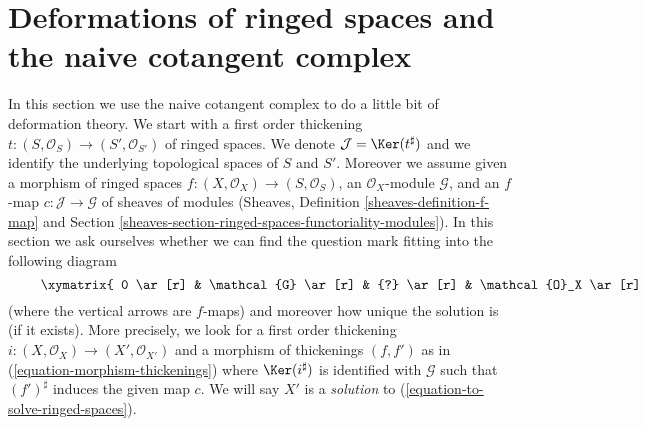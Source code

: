 \section{Deformations of ringed spaces and the naive cotangent complex}
\label{section-deformations-ringed-spaces}

\noindent
In this section we use the naive cotangent complex to do a little bit
of deformation theory. We start with a first order thickening
$t : (S, \mathcal{O}_S) \to (S', \mathcal{O}_{S'})$ of ringed spaces.
We denote $\mathcal{J} = \Ker(t^\sharp)$ and we
identify the underlying topological spaces of $S$ and $S'$.
Moreover we assume given a morphism of ringed spaces
$f : (X, \mathcal{O}_X) \to (S, \mathcal{O}_S)$, an $\mathcal{O}_X$-module
$\mathcal{G}$, and an $f$-map $c : \mathcal{J} \to \mathcal{G}$
of sheaves of modules (Sheaves, Definition \ref{sheaves-definition-f-map}
and Section \ref{sheaves-section-ringed-spaces-functoriality-modules}).
In this section we ask ourselves whether we can find
the question mark fitting into the following diagram
\begin{equation}
\label{equation-to-solve-ringed-spaces}
\vcenter{
\xymatrix{
0 \ar[r] & \mathcal{G} \ar[r] & {?} \ar[r] & \mathcal{O}_X \ar[r] & 0 \\
0 \ar[r] & \mathcal{J} \ar[u]^c \ar[r] & \mathcal{O}_{S'} \ar[u] \ar[r] &
\mathcal{O}_S \ar[u] \ar[r] & 0
}
}
\end{equation}
(where the vertical arrows are $f$-maps)
and moreover how unique the solution is (if it exists). More precisely,
we look for a first order thickening
$i : (X, \mathcal{O}_X) \to (X', \mathcal{O}_{X'})$
and a morphism of thickenings $(f, f')$ as in
(\ref{equation-morphism-thickenings})
where $\Ker(i^\sharp)$ is identified with $\mathcal{G}$
such that $(f')^\sharp$ induces the given map $c$.
We will say $X'$ is a {\it solution} to
(\ref{equation-to-solve-ringed-spaces}).

